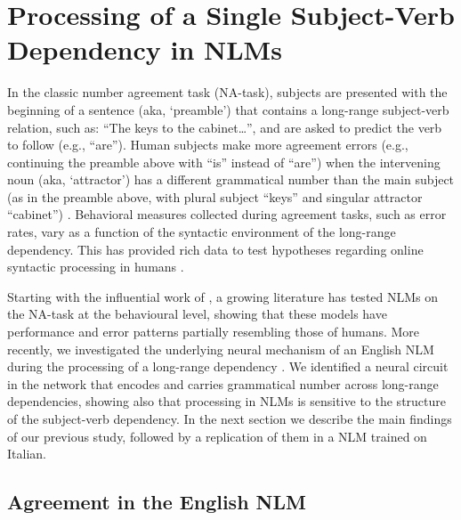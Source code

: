 \section{Processing of a Single Subject-Verb Dependency in NLMs}
In the classic number agreement task (NA-task), subjects are presented with the beginning of a sentence (aka, `preamble') that contains a long-range subject-verb relation, such as: ``The keys to the cabinet\ldots'', and are asked to predict the verb to follow (e.g., ``are''). Human subjects make more agreement errors (e.g., continuing the preamble  above with ``is'' instead of ``are'') when the intervening noun (aka, `attractor') has a different grammatical number than the main subject (as in the preamble above, with plural subject ``keys'' and singular attractor ``cabinet'') . Behavioral measures collected during agreement tasks, such as error rates, vary as a function of the syntactic environment of the long-range dependency. This has provided rich data to test hypotheses regarding online syntactic processing in humans \citep[e.g., ][]{franck2002subject, franck2006agreement, franck2007syntactic}.

Starting with the influential work of \citet{Linzen:etal:2016}, a growing
literature \citep[e.g.,][]{Gulordava:etal:2018, Bernardy:Lappin:2017,
  Giulianelli:etal:2018, Kuncoro:etal:2018a,Linzen:Leonard:2018,jumelet2019analysing} has
tested NLMs on the NA-task at the behavioural level, showing that these models have performance
and error patterns partially resembling those of humans.
More recently, we investigated the underlying neural mechanism of an
English NLM during the processing of a long-range dependency
\citep{lakretz2019emergence}. We identified a neural circuit in the
network that encodes and carries grammatical number across long-range
dependencies, showing also that processing in NLMs is sensitive to the
structure of the subject-verb dependency. In the next section we
describe the main findings of our previous study, followed by a replication of them in a NLM trained on Italian. 



\subsection{Agreement in the English NLM}

